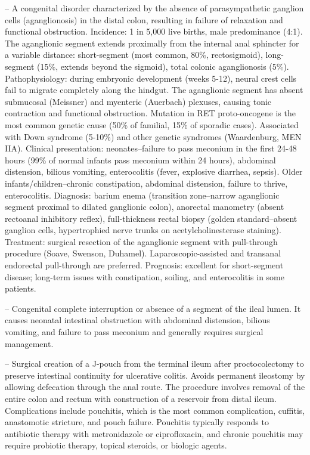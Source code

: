 -- A congenital disorder characterized by the absence of parasympathetic ganglion cells (aganglionosis) in the distal colon, resulting in failure of relaxation and functional obstruction. Incidence: 1 in 5,000 live births, male predominance (4:1). The aganglionic segment extends proximally from the internal anal sphincter for a variable distance: short-segment (most common, 80\%, rectosigmoid), long-segment (15\%, extends beyond the sigmoid), total colonic aganglionosis (5\%). Pathophysiology: during embryonic development (weeks 5-12), neural crest cells fail to migrate completely along the hindgut. The aganglionic segment has absent submucosal (Meissner) and myenteric (Auerbach) plexuses, causing tonic contraction and functional obstruction. Mutation in RET proto-oncogene is the most common genetic cause (50\% of familial, 15\% of sporadic cases). Associated with Down syndrome (5-10\%) and other genetic syndromes (Waardenburg, MEN IIA). Clinical presentation: neonates--failure to pass meconium in the first 24-48 hours (99\% of normal infants pass meconium within 24 hours), abdominal distension, bilious vomiting, enterocolitis (fever, explosive diarrhea, sepsis). Older infants/children--chronic constipation, abdominal distension, failure to thrive, enterocolitis. Diagnosis: barium enema (transition zone--narrow aganglionic segment proximal to dilated ganglionic colon), anorectal manometry (absent rectoanal inhibitory reflex), full-thickness rectal biopsy (golden standard--absent ganglion cells, hypertrophied nerve trunks on acetylcholinesterase staining). Treatment: surgical resection of the aganglionic segment with pull-through procedure (Soave, Swenson, Duhamel). Laparoscopic-assisted and transanal endorectal pull-through are preferred. Prognosis: excellent for short-segment disease; long-term issues with constipation, soiling, and enterocolitis in some patients.

-- Congenital complete interruption or absence of a segment of the ileal lumen. It causes neonatal intestinal obstruction with abdominal distension, bilious vomiting, and failure to pass meconium and generally requires surgical management.

-- Surgical creation of a J-pouch from the terminal ileum after proctocolectomy to preserve intestinal continuity for ulcerative colitis. Avoids permanent ileostomy by allowing defecation through the anal route. The procedure involves removal of the entire colon and rectum with construction of a reservoir from distal ileum. Complications include pouchitis, which is the most common complication, cuffitis, anastomotic stricture, and pouch failure. Pouchitis typically responds to antibiotic therapy with metronidazole or ciprofloxacin, and chronic pouchitis may require probiotic therapy, topical steroids, or biologic agents.

